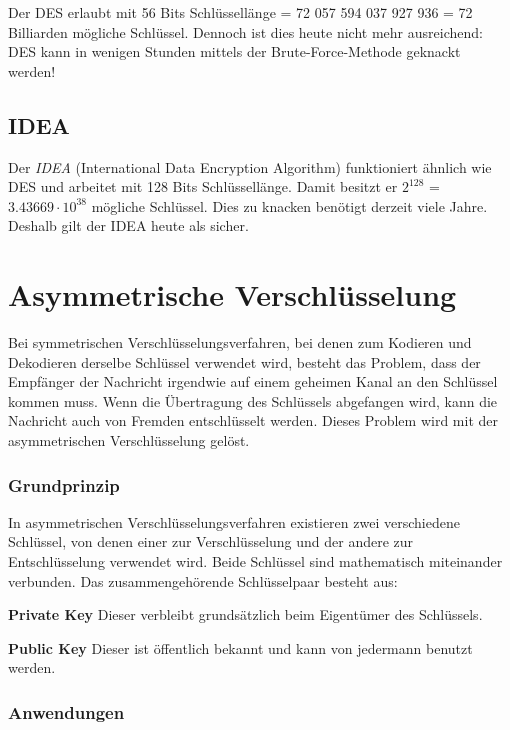 Der DES erlaubt mit 56 Bits Schlüssellänge = 72 057 594 037 927 936 = 72
Billiarden mögliche Schlüssel. Dennoch ist dies heute nicht mehr ausreichend:
DES kann in wenigen Stunden mittels der Brute-Force-Methode geknackt werden!

\subsection{IDEA}

Der \emph{IDEA} (\glqq International Data Encryption Algorithm\grqq )
funktioniert ähnlich wie DES und arbeitet mit 128 Bits Schlüssellänge. Damit
besitzt er $2^{128}$ = $3.43669 \cdot 10^{38}$ mögliche Schlüssel. Dies zu
knacken benötigt derzeit viele Jahre. Deshalb gilt der IDEA heute als
sicher.


\section{Asymmetrische Verschlüsselung}

Bei symmetrischen Verschlüsselungsverfahren, bei denen zum Kodieren und
Dekodieren derselbe Schlüssel verwendet wird, besteht das Problem, dass der
Empfänger der Nachricht irgendwie auf einem geheimen Kanal an den Schlüssel
kommen muss. Wenn die Übertragung des Schlüssels abgefangen wird, kann die
Nachricht auch von Fremden entschlüsselt werden. Dieses Problem wird mit der
asymmetrischen Verschlüsselung gelöst.

\subsubsection{Grundprinzip}

In asymmetrischen Verschlüsselungsverfahren existieren zwei verschiedene
Schlüssel, von denen einer zur Verschlüsselung und der andere zur
Entschlüsselung verwendet wird. Beide Schlüssel sind mathematisch miteinander
verbunden. Das zusammengehörende Schlüsselpaar besteht aus:

\begin{compactitem}
\item[\textbf{Private Key}] Dieser verbleibt grundsätzlich beim Eigentümer des
Schlüssels.
\item[\textbf{Public Key}] Dieser ist öffentlich bekannt und kann von jedermann
benutzt werden.
\end{compactitem}

\subsubsection{Anwendungen}

